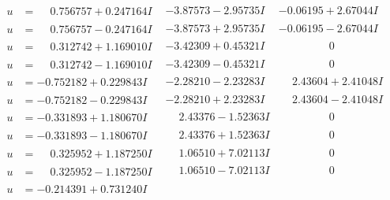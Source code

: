 \documentclass[1p]{elsarticle_modified}
\theoremstyle{definition}
\begin{document}
$$\begin{array}{c|c|c}
 \hline 
\begin{aligned}
u &= \phantom{-}0.756757 + 0.247164 I\end{aligned}
 & -3.87573 - 2.95735 I & -0.06195 + 2.67044 I \\ \hline\begin{aligned}
u &= \phantom{-}0.756757 - 0.247164 I\end{aligned}
 & -3.87573 + 2.95735 I & -0.06195 - 2.67044 I \\ \hline\begin{aligned}
u &= \phantom{-}0.312742 + 1.169010 I\end{aligned}
 & -3.42309 + 0.45321 I & \phantom{-0.000000 } 0 \\ \hline\begin{aligned}
u &= \phantom{-}0.312742 - 1.169010 I\end{aligned}
 & -3.42309 - 0.45321 I & \phantom{-0.000000 } 0 \\ \hline\begin{aligned}
u &= -0.752182 + 0.229843 I\end{aligned}
 & -2.28210 - 2.23283 I & \phantom{-}2.43604 + 2.41048 I \\ \hline\begin{aligned}
u &= -0.752182 - 0.229843 I\end{aligned}
 & -2.28210 + 2.23283 I & \phantom{-}2.43604 - 2.41048 I \\ \hline\begin{aligned}
u &= -0.331893 + 1.180670 I\end{aligned}
 & \phantom{-}2.43376 - 1.52363 I & \phantom{-0.000000 } 0 \\ \hline\begin{aligned}
u &= -0.331893 - 1.180670 I\end{aligned}
 & \phantom{-}2.43376 + 1.52363 I & \phantom{-0.000000 } 0 \\ \hline\begin{aligned}
u &= \phantom{-}0.325952 + 1.187250 I\end{aligned}
 & \phantom{-}1.06510 + 7.02113 I & \phantom{-0.000000 } 0 \\ \hline\begin{aligned}
u &= \phantom{-}0.325952 - 1.187250 I\end{aligned}
 & \phantom{-}1.06510 - 7.02113 I & \phantom{-0.000000 } 0 \\ \hline\begin{aligned}
u &= -0.214391 + 0.731240 I\end{aligned}

\end{array}$$
\end{document}
